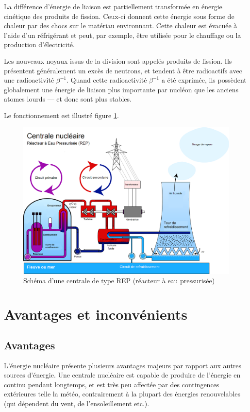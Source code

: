 \documentclass[12pt,a4paper,oneside,openany]{memoir}
\begin{document}
La différence d'énergie de liaison est partiellement transformée en énergie cinétique des produits de fission. Ceux-ci donnent cette énergie sous forme de chaleur par des chocs sur le matériau environnant. Cette chaleur est évacuée à l'aide d'un réfrigérant et peut, par exemple, être utilisée pour le chauffage ou la production d'électricité. 

Les nouveaux noyaux issus de la division sont appelés produits de fission. Ils présentent généralement un excès de neutrons, et tendent à être radioactifs avec une radioactivité $\beta^{-1}$. Quand cette radioactivité $\beta^{-1}$ a été exprimée, ils possèdent globalement une énergie de liaison plus importante par nucléon que les anciens atomes lourds — et donc sont plus stables.

Le fonctionnement est illustré figure \ref{centrale}.

\begin{figure}[h]
	\centering
	\includegraphics[width=\textwidth]{img/centrale.png}
	\caption{Schéma d'une centrale de type REP (réacteur à eau pressurisée)}
	\label{centrale}
\end{figure}


\section{Avantages et inconvénients}

\subsection{Avantages}
L'énergie nucléaire présente plusieurs avantages majeurs par rapport aux autres sources d'énergie. Une centrale nucléaire est capable de produire de l'énergie en continu pendant longtemps, et est très peu affectée par des contingences extérieures telle la météo, contrairement à la plupart des énergies renouvelables (qui dépendent du vent, de l'ensoleillement etc.).
\end{document}
